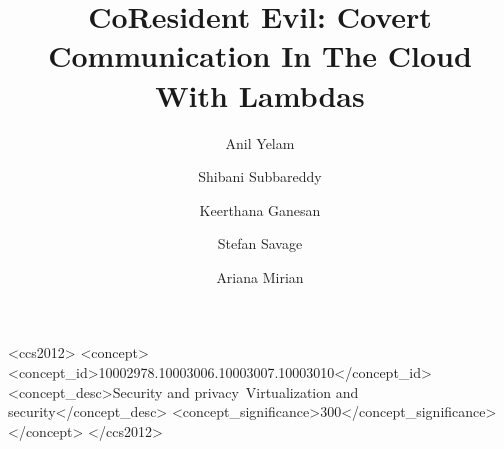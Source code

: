 \documentclass[sigconf]{acmart}
\begin{document}
\sloppy

\title[Covert Communication In The Cloud With Lambdas]
{CoResident Evil: Covert Communication In The Cloud With Lambdas} %

\author{Anil Yelam}

\author{Shibani Subbareddy}

\author{Keerthana Ganesan}
\authornotemark[1]

\author{Stefan Savage}

\author{Ariana Mirian}






\begin{CCSXML}
<ccs2012>
<concept>
<concept_id>10002978.10003006.10003007.10003010</concept_id>
<concept_desc>Security and privacy~Virtualization and security</concept_desc>
<concept_significance>300</concept_significance>
</concept>
</ccs2012>
\end{CCSXML}
\end{document}
